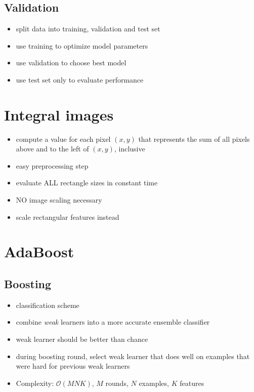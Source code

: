 \documentclass[12pt]{article}
\begin{document}
	\subsection{Validation}
	\begin{itemize}
		\item split data into training, validation and test set
		\item use training to optimize model parameters
		\item use validation to choose best model
		\item use test set only to evaluate performance
	\end{itemize}
	
	
	\section{Integral images}
	\begin{itemize}
		\item compute a value for each pixel $(x,y)$ that represents the sum of all pixels above and to the left of $(x,y)$, inclusive
		\item easy preprocessing step
		\item evaluate ALL rectangle sizes in constant time
		\item NO image scaling necessary
		\item scale rectangular features instead
	\end{itemize}

	\section{AdaBoost}
	\subsection{Boosting}
	\begin{itemize}
		\item classification scheme
		\item combine \textit{weak} learners into a more accurate ensemble classifier
		\item weak learner should be better than chance
		\item during boosting round, select weak learner that does well on examples that were hard for previous weak learners
		\item Complexity: $\mathcal{O}(MNK)$, $M$ rounds, $N$ examples, $K$ features
	\end{itemize}
\end{document}
